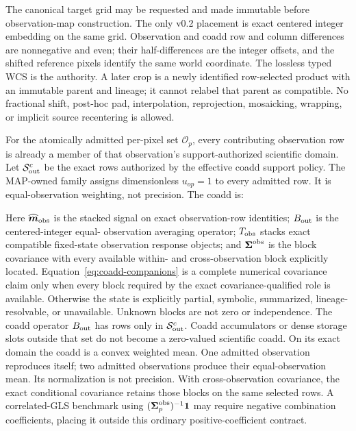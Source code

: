 \documentclass[10pt]{article}
\begin{document}
\SCIMapProductRoleDefinition

\SCIMapProductRoleDependencyTable

The canonical target grid may be requested and made immutable before
observation-map construction. The only v0.2 placement is exact centered
integer embedding on the same grid.
Observation and coadd row and column differences are nonnegative and even;
their half-differences are the integer offsets, and the shifted reference
pixels identify the same world coordinate. The lossless typed WCS is the
authority. A later crop is a newly identified row-selected product with an
immutable parent and lineage; it cannot relabel that parent as compatible. No
fractional shift, post-hoc pad, interpolation, reprojection, mosaicking,
wrapping, or implicit source recentering is allowed.

For the atomically admitted per-pixel set \(\mathcal O_p\), every contributing
observation row is already a member of that observation's support-authorized
scientific domain. Let \(\mathcal S^c_{\rm out}\) be the exact rows authorized
by the effective coadd support policy. The MAP-owned family
\SCIMapUniformCoaddProfile{} assigns dimensionless
\(u_{op}=1\) to every admitted row. It is equal-observation weighting, not
precision. The coadd is:

\SCIMapCoaddEquations

Here \(\widehat{\boldsymbol m}_{\rm obs}\) is the stacked signal on exact
observation-row identities; \(B_{\rm out}\) is the centered-integer equal-
observation averaging operator; \(T_{\rm obs}\) stacks exact compatible
fixed-state observation response objects; and \(\boldsymbol\Sigma^{\rm obs}\)
is the block covariance with
every available within- and cross-observation block explicitly located.
Equation~\eqref{eq:coadd-companions} is a complete numerical covariance claim
only when every block required by the exact covariance-qualified role is
available. Otherwise the state is explicitly partial, symbolic, summarized,
lineage-resolvable, or unavailable. Unknown blocks are not zero or
independence. The coadd operator \(B_{\rm out}\) has rows only in
\(\mathcal S^c_{\rm out}\). Coadd accumulators or dense storage slots outside
that set do not become a zero-valued scientific coadd. On its exact domain the
coadd is a convex weighted mean. One admitted observation reproduces itself;
two admitted observations produce their equal-observation mean. Its
normalization is not precision. With cross-observation covariance, the exact
conditional covariance retains those blocks on the same selected rows. A
correlated-GLS benchmark using
\((\boldsymbol\Sigma^{\rm obs}_p)^{-1}\boldsymbol 1\) may require negative combination coefficients,
placing it outside this ordinary positive-coefficient contract.
\end{document}
